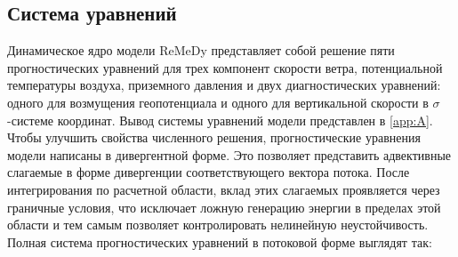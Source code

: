 \subsection{Система уравнений}
Динамическое ядро модели ReMeDy представляет собой решение пяти прогностических уравнений для трех компонент скорости ветра, потенциальной температуры воздуха, приземного давления и двух диагностических уравнений: одного для возмущения геопотенциала и одного для вертикальной скорости в $\sigma$-системе координат. Вывод системы уравнений модели представлен в \ref{app:A}. Чтобы улучшить свойства численного решения, прогностические уравнения модели написаны в дивергентной форме. Это позволяет представить адвективные слагаемые в форме дивергенции соответствующего вектора потока. После интегрирования по расчетной области, вклад этих слагаемых проявляется через граничные условия, что исключает ложную генерацию энергии в пределах этой области и тем самым позволяет контролировать нелинейную неустойчивость. Полная система прогностических уравнений в потоковой форме выглядят так:
